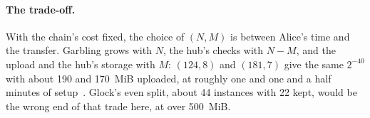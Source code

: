 \documentclass[11pt]{article}
\begin{document}
\paragraph{The trade-off.} With the chain's cost fixed, the choice of
$(N, M)$ is between Alice's time and the transfer. Garbling grows with
$N$, the hub's checks with $N - M$, and the upload and the hub's
storage with $M$: $(124, 8)$ and $(181, 7)$ give the same $2^{-40}$ with
about 190 and 170~MiB uploaded, at roughly one and one and a half
minutes of setup~\cite{lichenbuilt}. Glock's even split, about 44
instances with 22 kept, would be the wrong end of that trade here, at
over 500~MiB.
\end{document}
